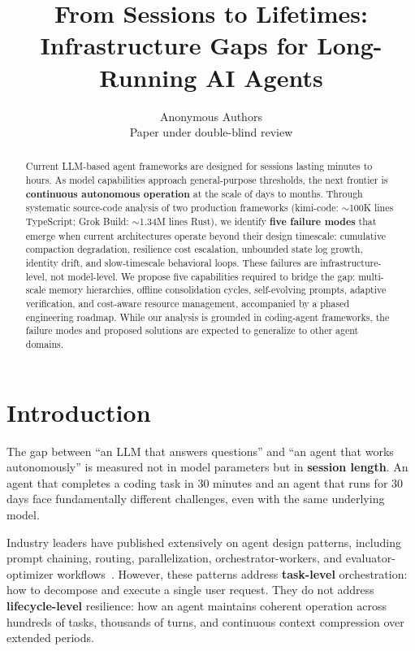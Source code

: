 \documentclass{article}
\title{From Sessions to Lifetimes: Infrastructure Gaps for Long-Running AI Agents}
\author{
  Anonymous Authors\\
  Paper under double-blind review\\
}
\begin{document}
\maketitle

\begin{abstract}
Current LLM-based agent frameworks are designed for sessions lasting minutes to hours. As model capabilities approach general-purpose thresholds, the next frontier is \textbf{continuous autonomous operation} at the scale of days to months. Through systematic source-code analysis of two production frameworks (kimi-code: ${\sim}$100K lines TypeScript; Grok Build: ${\sim}$1.34M lines Rust), we identify \textbf{five failure modes} that emerge when current architectures operate beyond their design timescale: cumulative compaction degradation, resilience cost escalation, unbounded state log growth, identity drift, and slow-timescale behavioral loops. These failures are infrastructure-level, not model-level. We propose five capabilities required to bridge the gap: multi-scale memory hierarchies, offline consolidation cycles, self-evolving prompts, adaptive verification, and cost-aware resource management, accompanied by a phased engineering roadmap. While our analysis is grounded in coding-agent frameworks, the failure modes and proposed solutions are expected to generalize to other agent domains.
\end{abstract}

\section{Introduction}

The gap between ``an LLM that answers questions'' and ``an agent that works autonomously'' is measured not in model parameters but in \textbf{session length}. An agent that completes a coding task in 30 minutes and an agent that runs for 30 days face fundamentally different challenges, even with the same underlying model.

Industry leaders have published extensively on agent design patterns, including prompt chaining, routing, parallelization, orchestrator-workers, and evaluator-optimizer workflows~\cite{anthropic2024, openai2025agents, google2026patterns}. However, these patterns address \textbf{task-level} orchestration: how to decompose and execute a single user request. They do not address \textbf{lifecycle-level} resilience: how an agent maintains coherent operation across hundreds of tasks, thousands of turns, and continuous context compression over extended periods.
\end{document}
